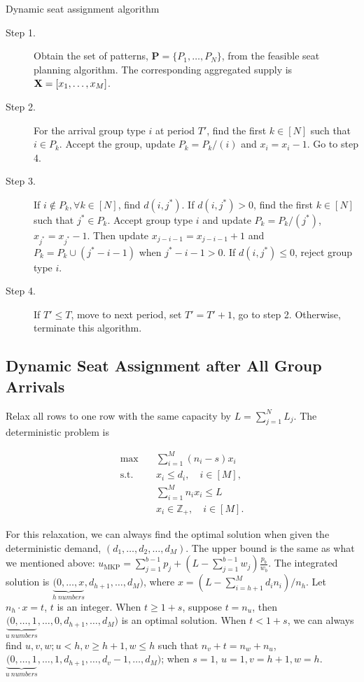 \begin{algorithm}[H]
  \caption{Dynamic seat assignment algorithm}\label{algo_nested_policy}
  \begin{description}
    \item[Step 1.] Obtain the set of patterns, $\mathbf{P} = \{P_1,\ldots,P_{N}\}$, from the feasible seat planning algorithm. The corresponding aggregated supply is $\mathbf{X} = [x_{1}, \ldots, x_{M}]$.
    \item[Step 2.] For the arrival group type $i$ at period $T{'}$, find the first $k \in [N]$ such that $i \in P_k$. Accept the group, update $P_{k} = P_{k}/(i)$ and $x_{i} = x_{i} -1$. Go to step 4.
    \item[Step 3.] If $i \notin P_k, \forall k \in [N]$, find $d(i,j^{*})$. If $d(i,j^{*})>0$, find the first $k \in [N]$ such that $j^{*} \in P_k$. Accept group type $i$ and update $P_{k} = P_{k}/(j^{*})$, $x_{j^{*}} = x_{j^{*}} -1$. Then update $x_{j-i-1} = x_{j-i-1} + 1$ and $P_{k}= P_{k} \cup (j^{*}-i-1)$ when $j^{*}-i-1 > 0$. If $d(i,j^{*}) \leq 0$, reject group type $i$.
    \item[Step 4.] If $T{'} \leq T$, move to next period, set $T{'} = T{'}+1$, go to step 2. Otherwise, terminate this algorithm.
  \end{description}
\end{algorithm}

\subsection{Dynamic Seat Assignment after All Group Arrivals}
Relax all rows to one row with the same capacity by $L = \sum_{j=1}^{N} L_j$. The deterministic problem is 

\begin{equation}\label{relax_deter}
  \begin{aligned}
  \max \quad & \sum_{i=1}^{M} (n_i- s) x_{i} \\
  \text {s.t.} \quad & x_{i} \leq d_{i}, \quad i \in [M], \\
  & \sum_{i=1}^{M} n_{i} x_{i} \leq L \\
  & x_{i} \in \mathbb{Z}_{+}, \quad i \in [M].
  \end{aligned}
\end{equation}

For this relaxation, we can always find the optimal solution when given the deterministic demand, $ (d_{1}, \ldots, d_{2}, \ldots, d_{M})$. The upper bound is the same as what we mentioned above: $u_{\mathrm{MKP}}=\sum_{j=1}^{b-1} p_j+\left(L-\sum_{j=1}^{b-1} w_j\right) \frac{p_b}{w_b}$. The integrated solution is $\underbrace{(0, \ldots, x}_{h ~numbers},d_{h+1}, \ldots, d_{M})$, where $x = (L- \sum_{i = h+1}^{M} {d_i n_i})/ n_h$. Let $n_h \cdot x = t$, $t$ is an integer. When $t \geq 1+s$, suppose $t = n_{u}$, then $\underbrace{(0, \ldots, 1}_{u ~numbers}, \ldots, 0, d_{h+1}, \ldots, d_{M})$ is an optimal solution. When $t < 1+s$, we can always find $u,v,w; u<h, v \geq h+1, w \leq h$ such that $n_{v} + t = n_{w} + n_{u}$, $\underbrace{(0, \ldots, 1}_{u ~numbers}, \ldots, 1, d_{h+1}, \ldots,d_{v}-1, \ldots, d_{M})$; when $s=1$, $u = 1, v = h+1, w =h$. 

